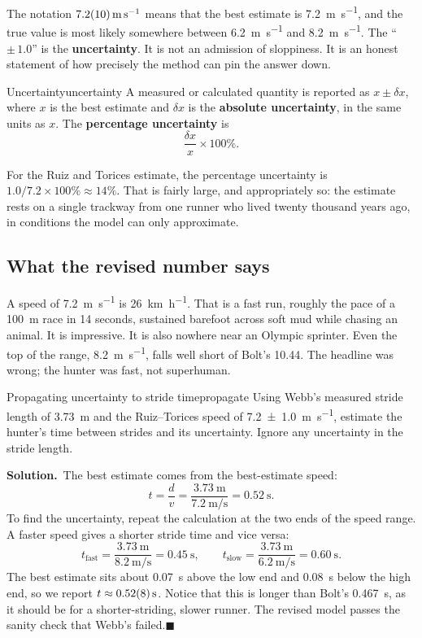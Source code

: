 \documentclass[11pt,twoside,openany]{book}
\newcounter{check}[chapter]
\newcommand{\solution}{\par\smallskip\noindent\textbf{Solution.}\ }
\newcommand{\qed}{\hfill$\blacksquare$}
\begin{document}
The notation $\SI{7.2 \pm 1.0}{\metre\per\second}$ means that the best estimate is \SI{7.2}{\metre\per\second}, and the true value is most likely somewhere between \SI{6.2}{\metre\per\second} and \SI{8.2}{\metre\per\second}. The ``$\pm\,1.0$'' is the \textbf{uncertainty}. It is not an admission of sloppiness. It is an honest statement of how precisely the method can pin the answer down.

\begin{definition}{Uncertainty}{uncertainty}
A measured or calculated quantity is reported as $x \pm \delta x$, where $x$ is the best estimate and $\delta x$ is the \textbf{absolute uncertainty}, in the same units as $x$. The \textbf{percentage uncertainty} is
\[
\frac{\delta x}{x}\times 100\%.
\]
\end{definition}

For the Ruiz and Torices estimate, the percentage uncertainty is $1.0/7.2 \times 100\% \approx 14\%$. That is fairly large, and appropriately so: the estimate rests on a single trackway from one runner who lived twenty thousand years ago, in conditions the model can only approximate.

\subsection{What the revised number says}

A speed of \SI{7.2}{\metre\per\second} is \SI{26}{\kilo\metre\per\hour}. That is a fast run, roughly the pace of a \SI{100}{\metre} race in \num{14} seconds, sustained barefoot across soft mud while chasing an animal. It is impressive. It is also nowhere near an Olympic sprinter. Even the top of the range, \SI{8.2}{\metre\per\second}, falls well short of Bolt's \num{10.44}. The headline was wrong; the hunter was fast, not superhuman.

\begin{example}{Propagating uncertainty to stride time}{propagate}
Using Webb's measured stride length of \SI{3.73}{\metre} and the Ruiz--Torices speed of \SI{7.2 \pm 1.0}{\metre\per\second}, estimate the hunter's time between strides and its uncertainty. Ignore any uncertainty in the stride length.

\solution The best estimate comes from the best-estimate speed:
\[
t = \frac{d}{v} = \frac{\SI{3.73}{\metre}}{\SI{7.2}{\metre\per\second}} = \SI{0.52}{\second}.
\]
To find the uncertainty, repeat the calculation at the two ends of the speed range. A faster speed gives a shorter stride time and vice versa:
\[
t_{\text{fast}} = \frac{\SI{3.73}{\metre}}{\SI{8.2}{\metre\per\second}} = \SI{0.45}{\second},
\qquad
t_{\text{slow}} = \frac{\SI{3.73}{\metre}}{\SI{6.2}{\metre\per\second}} = \SI{0.60}{\second}.
\]
The best estimate sits about \SI{0.07}{\second} above the low end and \SI{0.08}{\second} below the high end, so we report $t \approx \SI{0.52 \pm 0.08}{\second}$. Notice that this is longer than Bolt's \SI{0.467}{\second}, as it should be for a shorter-striding, slower runner. The revised model passes the sanity check that Webb's failed.\qed
\end{example}
\end{document}
